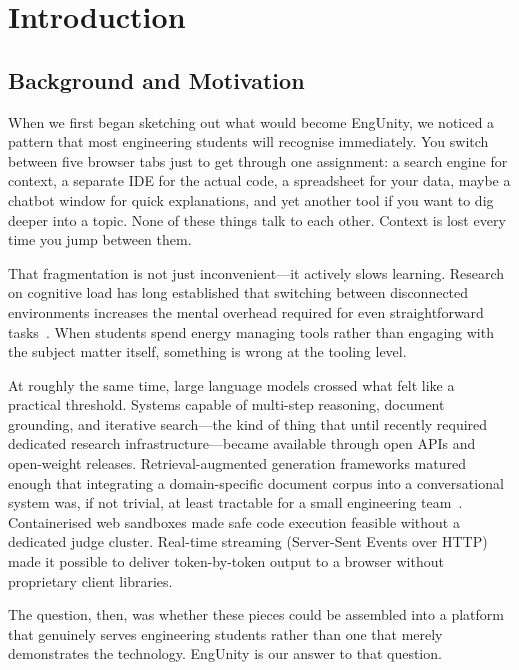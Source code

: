 \chapter{Introduction}
\label{chap:intro}

\section{Background and Motivation}
\label{sec:background}

When we first began sketching out what would become EngUnity, we noticed a pattern
that most engineering students will recognise immediately. You switch between five
browser tabs just to get through one assignment: a search engine for context, a
separate IDE for the actual code, a spreadsheet for your data, maybe a chatbot
window for quick explanations, and yet another tool if you want to dig deeper into
a topic. None of these things talk to each other. Context is lost every time you
jump between them.

That fragmentation is not just inconvenient---it actively slows learning. Research
on cognitive load has long established that switching between disconnected
environments increases the mental overhead required for even straightforward
tasks~\citep{sweller1988cognitive}. When students spend energy managing tools rather
than engaging with the subject matter itself, something is wrong at the tooling level.

At roughly the same time, large language models crossed what felt like a practical
threshold. Systems capable of multi-step reasoning, document grounding, and
iterative search---the kind of thing that until recently required dedicated research
infrastructure---became available through open APIs and open-weight releases.
Retrieval-augmented generation frameworks matured enough that integrating a
domain-specific document corpus into a conversational system was, if not trivial,
at least tractable for a small engineering team~\citep{lewis2020rag}.
Containerised web sandboxes made safe code execution feasible without a dedicated
judge cluster. Real-time streaming (Server-Sent Events over HTTP) made it possible
to deliver token-by-token output to a browser without proprietary client libraries.

The question, then, was whether these pieces could be assembled into a platform that
genuinely serves engineering students rather than one that merely demonstrates the
technology. EngUnity is our answer to that question.

